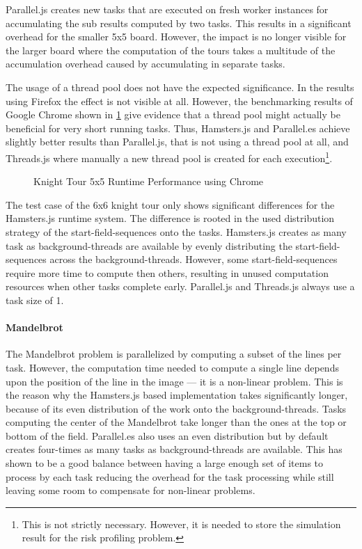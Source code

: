 Parallel.js creates new tasks that are executed on fresh worker instances for accumulating the sub results computed by two tasks. This results in a significant overhead for the smaller 5x5 board. However, the impact is no longer visible for the larger board where the computation of the tours takes a multitude of the accumulation overhead caused by accumulating in separate tasks.

The usage of a thread pool does not have the expected significance. In the results using Firefox the effect is not visible at all. However, the benchmarking results of Google Chrome shown in \cref{fig:runtime-performance-chrome} give evidence that a thread pool might actually be beneficial for very short running tasks. Thus, Hamsters.js and Parallel.es achieve slightly better results than Parallel.js, that is not using a thread pool at all, and Threads.js where manually a new thread pool is created for each execution\footnote{This is not strictly necessary. However, it is needed to store the simulation result for the risk profiling problem.}.

\begin{figure}
	\centering
	
	\caption{Knight Tour 5x5 Runtime Performance using Chrome}
	\label{fig:runtime-performance-chrome}
\end{figure}

The test case of the 6x6 knight tour only shows significant differences for the Hamsters.js runtime system. The difference is rooted in the used distribution strategy of the start-field-sequences onto the tasks. Hamsters.js creates as many task as background-threads are available by evenly distributing the start-field-sequences across the background-threads. However, some start-field-sequences require more time to compute then others, resulting in unused computation resources when other tasks complete early. Parallel.js and Threads.js always use a task size of 1.

\paragraph{Mandelbrot}
The Mandelbrot problem is parallelized by computing a subset of the lines per task. However, the computation time needed to compute a single line depends upon the position of the line in the image --- it is a non-linear problem. This is the reason why the Hamsters.js based implementation takes significantly longer, because of its even distribution of the work onto the background-threads. Tasks computing the center of the Mandelbrot take longer than the ones at the top or bottom of the field. Parallel.es also uses an even distribution but by default creates four-times as many tasks as background-threads are available. This has shown to be a good balance between having a large enough set of items to process by each task reducing the overhead for the task processing while still leaving some room to compensate for non-linear problems. 

